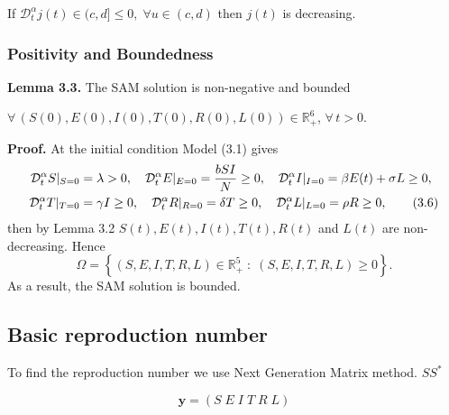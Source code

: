 \documentclass[10pt]{NSP1}
\newcommand{\CD}{\mathcal{D}}
\begin{document}
If $  \CD_t^\alpha j(t) \in (c,d] \le 0,\; \forall u \in (c,d)$ then $j(t)$ is decreasing.

\subsubsection{\bfseries Positivity and Boundedness}

\noindent\textbf{Lemma 3.3.}
The SAM solution is non-negative and bounded

$\forall\,(S(0),E(0),I(0),T(0),R(0),L(0)) \in \mathbb{R}_{+}^{6}$,
$\forall\,t>0$.


\textbf{Proof.} At the initial condition Model (3.1) gives
\begin{align}
  \CD_t^\alpha S|_{S=0} &= \lambda > 0, \quad
  \CD_t^\alpha E|_{E=0} = \frac{b S I}{N} \ge 0, \quad
  \CD_t^\alpha I|_{I=0} = \beta E(t) + \sigma L \ge 0, \notag \\
  \CD_t^\alpha T|_{T=0} &= \gamma I \ge 0, \quad
  \CD_t^\alpha R|_{R=0} = \delta T \ge 0, \quad
  \CD_t^\alpha L|_{L=0} = \rho R \ge 0,
\tag{3.6}
\end{align}
then by Lemma 3.2 $S(t),E(t),I(t),T(t),R(t)$ and $L(t)$ are non-decreasing. Hence
\begin{equation}
\Omega = \left\{ (S,E,I,T,R,L) \in \mathbb{R}_{+}^{5} \;:\; (S,E,I,T,R,L) \ge 0 \right\}.
\tag{3.7}
\end{equation}
As a result, the SAM solution is bounded.

\subsection {\centering\bfseries Basic reproduction number}

To find the reproduction number we use Next Generation Matrix method. $SS^*$

\begin{equation}
\mathbf{y}=(S\;E\;I\;T\;R\;L)
\tag{3.8}
\end{equation}
\end{document}
